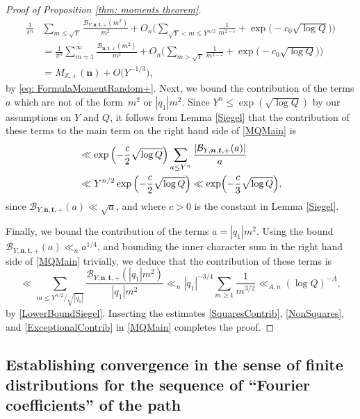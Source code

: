 \documentclass[JEP,XML,SOM,Unicode,NoFloatCountersInSection,published]{cedram}
\theoremstyle{plain}
\theoremstyle{definition}
\newcommand{\X}{\mathbb{X}}
\newcommand{\B}{\mathcal{B}}
\newcommand{\un}{\boldsymbol{n}}
\newcommand{\ut}{\boldsymbol{t}}
\begin{document}
\begin{proof}[Proof of Proposition \ref{thm: moments theorem}]
\begin{equation}
\begin{aligned}
\frac{1}{\pi^n}&\sum_{m\leq \sqrt{Y}}\frac{\B_{Y,\un, \ut, +}(m^2)}{m^2} + O_n\biggl(\sum_{\sqrt{Y}<m\leq Y^{n/2}}\frac{1}{m^{2-\varepsilon}}+ \exp\bigl(-c_0\sqrt{\log Q}\bigr)\biggr)\\
&= \frac{1}{\pi^n}\sum_{m=1}^{\infty}\frac{\B_{\un, \ut, +}(m^2)}{m^2} + O_n\biggl(\sum_{m> \sqrt{Y}}\frac{1}{m^{2-\varepsilon}}+\exp\bigl(-c_0\sqrt{\log Q}\bigr)\biggr)\\
&= M_{\X, +}(\un)+ O\bigl(Y^{-1/3}\bigr),
\end{aligned}
\end{equation}
by \eqref{eq: FormulaMomentRandom+}.
Next, we bound the contribution of the terms $a$ which are not of the form~$m^2$ or $|q_1|m^2$. Since $Y^n\leq \exp\left(\sqrt{\log Q}\right)$ by our assumptions on $Y$ and $Q$, it follows from Lemma \ref{Siegel} that the contribution of these terms to the main term on the right hand side of \eqref{MQMain} is
\begin{equation}\label{NonSquares}
\begin{aligned}
&\ll \exp\left(-\frac{c}{2}\sqrt{\log Q}\right)\sum_{a\leq Y^n}\frac{|\B_{Y,\un, \ut, +}(a)|}{a}\\
&\ll Y^{n/2} \exp\left(-\frac{c}{2}\sqrt{\log Q}\right) \ll \exp\Bigl(-\frac{c}{3}\sqrt{\log Q}\Bigr),
\end{aligned}
\end{equation}
since $\B_{Y,\un, \ut, +}(a)\ll \sqrt{a}$, and where $c>0$ is the constant in Lemma \ref{Siegel}.

Finally, we bound the contribution of the terms $a=|q_1|m^2$. Using the bound $\B_{Y,\un, \ut, +}(a)\ll_{n} a^{1/4}$, and bounding the inner character sum in the right hand side of \eqref{MQMain} trivially, we deduce that the contribution of these terms is
\begin{equation}\label{ExceptionalContrib}
\ll \sum_{m\leq Y^{n/2}/\sqrt{|q_1|}}\frac{\B_{Y,\un, \ut, +}(|q_1|m^2)}{|q_1|m^2}\ll_{n} |q_1|^{-3/4}\sum_{m\geq 1}\frac{1}{m^{3/2}}\ll_{A, n} (\log Q)^{-A},
\end{equation}
by \eqref{LowerBoundSiegel}.
Inserting the estimates \eqref{SquaresContrib}, \eqref{NonSquares}, and \eqref{ExceptionalContrib} in \eqref{MQMain} completes the proof.
\end{proof}

\subsection{Establishing convergence in the sense of finite distributions for the sequence of ``Fourier coefficients'' of the path}
\end{document}
